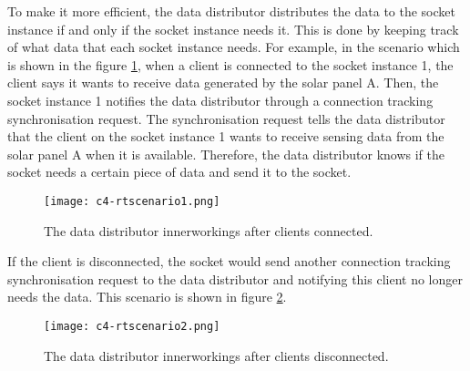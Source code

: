 \documentclass[../thesis.tex]{subfiles}
\begin{document}
To make it more efficient, the data distributor distributes the data to the socket instance if and only if the socket instance needs it. This is done by keeping track of what data that each socket instance needs. For example, in the scenario which is shown in the figure \ref{fig:rtscenario1}, when a client is connected to the socket instance 1, the client says it wants to receive data generated by the solar panel A. Then, the socket instance 1 notifies the data distributor through a connection tracking synchronisation request. The synchronisation request tells the data distributor that the client on the socket instance 1 wants to receive sensing data from the solar panel A when it is available. Therefore, the data distributor knows if the socket needs a certain piece of data and send it to the socket.

\begin{figure}[!ht]
\centering
\texttt{[image: c4-rtscenario1.png]}
\caption{The data distributor innerworkings after clients connected.}
\label{fig:rtscenario1}
\end{figure}


If the client is disconnected, the socket would send another connection tracking synchronisation request to the data distributor and notifying this client no longer needs the data. This scenario is shown in figure \ref{fig:rtscenario2}.

\begin{figure}[!ht]
\centering
\texttt{[image: c4-rtscenario2.png]}
\caption{The data distributor innerworkings after clients disconnected.}
\label{fig:rtscenario2}
\end{figure}
\end{document}

